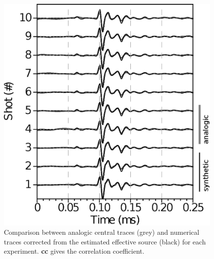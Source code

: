 \documentclass[manuscript,revised]{geophysics}
\begin{document}
\begin{figure}[!h]
	\centering
	\includegraphics[scale=1.0]{fig/spec_F50_CT_COMP.eps}
	\caption{Comparison between analogic central traces (grey) and numerical traces corrected from the estimated effective source (black) for each experiment. \textbf{cc} gives the correlation coefficient.}
	\label{panel_srcest_2d_mean_comp}
\end{figure}
\end{document}
